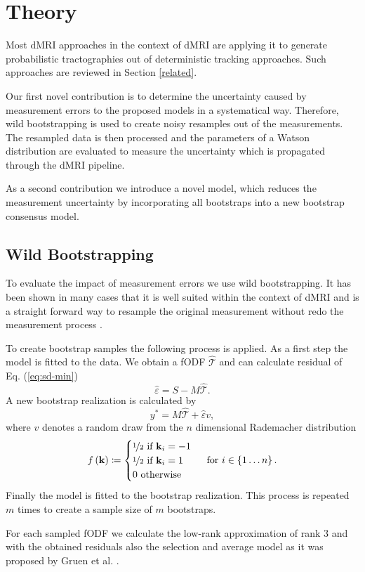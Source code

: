 \section{Theory}
Most dMRI approaches in the context of dMRI are applying it to generate
probabilistic tractographies out of deterministic tracking approaches. Such
approaches are reviewed in Section \ref{related}. 

Our first novel contribution is to determine the uncertainty caused by
measurement errors to the proposed models in a systematical way. Therefore, wild bootstrapping is used to create
noisy resamples out of the measurements. The resampled data is then processed
and the parameters of a Watson distribution are evaluated to measure the
uncertainty which is propagated through the dMRI pipeline. 

As a second contribution we introduce a novel model, which reduces the measurement
uncertainty by incorporating all bootstraps into a new bootstrap consensus model.

\subsection{Wild Bootstrapping}
To evaluate the impact of measurement errors we use wild bootstrapping. It
has been shown in many cases that it is well suited within the context of dMRI and
is a straight forward way to
resample the original measurement without redo the measurement process
\cite{Jones:2008}.

To create bootstrap samples the following process is applied. As a first step the model is fitted to the data. We obtain a fODF
$\hat{\mathcal{T}}$ and can calculate residual of Eq. (\ref{eq:sd-min}) 
\[ \hat{\varepsilon} = S - M\hat{\mathcal{T}} .\] 
A new bootstrap realization is calculated by 
\[ y^{*} = M\hat{\mathcal{T}}  + \hat{\varepsilon} v , \]
where $v$ denotes a random draw from the $n$ dimensional Rademacher distribution
\[ f \left( \mathbf{k} \right) \coloneqq  \begin{cases} \nicefrac{1}{2} \text{ if }
		\mathbf{k}_i=-1 \\
		\nicefrac{1}{2} \text{ if } \mathbf{k}_i=1 \\
		0 \text { otherwise } 
\end{cases} \text{ for } i \in \left\{ 1\dots n \right\} . \]
 Finally the model is fitted to the bootstrap realization. This process is repeated $m$
times to create a sample size of $m$ bootstraps.

For each sampled fODF we calculate the low-rank approximation of rank $3$
and with the obtained residuals also the selection and average model as it was
proposed by Gruen et al. \cite{Gruen:2021}.

